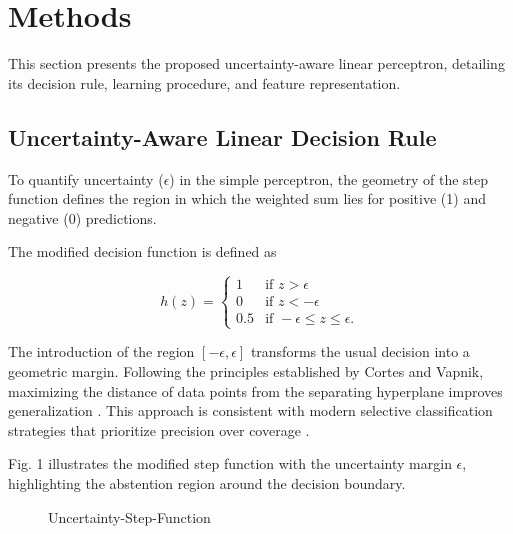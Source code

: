 \documentclass[conference]{IEEEtran}
\begin{document}
\section{Methods}

This section presents the proposed uncertainty-aware linear perceptron, detailing its decision rule, learning procedure, and feature representation.

\subsection{Uncertainty-Aware Linear Decision Rule}

To quantify uncertainty ($\epsilon$) in the simple perceptron, the geometry of the step function defines the region in which the weighted sum lies for positive (1) and negative (0) predictions.

The modified decision function is defined as

\begin{equation}
h(z) =
\begin{cases}
1   & \text{if } z > \epsilon \\
0   & \text{if } z < -\epsilon \\
0.5 & \text{if } -\epsilon \leq z \leq \epsilon.
\end{cases}
\end{equation}

The introduction of the region $[-\epsilon, \epsilon]$ transforms the usual decision into a geometric margin. Following the principles established by Cortes and Vapnik, maximizing the distance of data points from the separating hyperplane improves generalization \cite{b9}. This approach is consistent with modern selective classification strategies that prioritize precision over coverage \cite{b8}.

Fig. 1 illustrates the modified step function with the uncertainty margin $\epsilon$, highlighting the abstention region around the decision boundary.

\begin{figure}[H]
    \centering
    \caption{Uncertainty-Step-Function}
    \label{fig:Uncertainty-Step-Function}
\end{figure}
\end{document}
